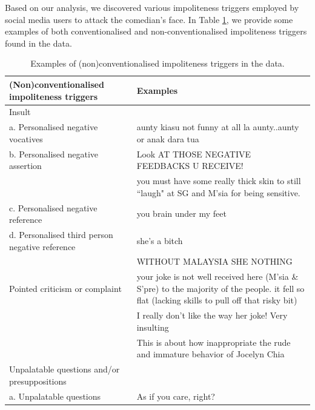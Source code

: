 \documentclass[english]{textolivre}
\begin{document}
Based on our analysis, we discovered various impoliteness triggers employed by social media users to attack the comedian’s face. In Table \ref{tab-3}, we provide some examples of both conventionalised and non-conventionalised impoliteness triggers found in the data.

\begin{longtable}{p{6.5cm} p{7.5cm}}
\caption{Examples of (non)conventionalised impoliteness triggers in the data.}\label{tab-3}\\
\toprule
{(Non)conventionalised impoliteness triggers} & Examples \\
\midrule
Insult & \\
\quad \hspace{1em} a. Personalised negative vocatives & aunty kiasu not funny at all la aunty..aunty or anak dara tua \\
\arrayrulecolor{gray!70}\cmidrule(l{2em}){1-2}
\quad \hspace{1em} b. Personalised negative assertion & Look AT THOSE NEGATIVE FEEDBACKS U RECEIVE! \\ 
\arrayrulecolor{gray!35}\cline{2-2}
 & you must have some really thick skin to still ``laugh" at SG and M’sia for being sensitive. \\ 
\arrayrulecolor{gray!70}\cmidrule(l{2em}){1-2}
\quad \hspace{1em} c. Personalised negative reference & you brain under my feet \\
\arrayrulecolor{gray!70}\cmidrule(l{2em}){1-2}
\quad \hspace{1em} d. Personalised third person negative refe\-rence & she's a bitch \\
\arrayrulecolor{gray!35}\cline{2-2}
 & WITHOUT MALAYSIA SHE NOTHING \\
\arrayrulecolor{gray!35}\cline{2-2}
\arrayrulecolor{gray!70}\hline
Pointed criticism or complaint & your joke is not well received here (M’sia \& S’pre) to the majority of the people. it fell so flat (lacking skills to pull off that risky bit) \\ 
\arrayrulecolor{gray!35}\cline{2-2}
 & I really don’t like the way her joke! Very insulting \\ 
\arrayrulecolor{gray!35}\cline{2-2}
 & This is about how inappropriate the rude and immature behavior of Jocelyn Chia \\
\arrayrulecolor{gray!70}\hline
Unpalatable questions and/or presuppositions & \\
\quad \hspace{1em} a. Unpalatable questions & As if you care, right? \\ 

\end{longtable}
\end{document}
